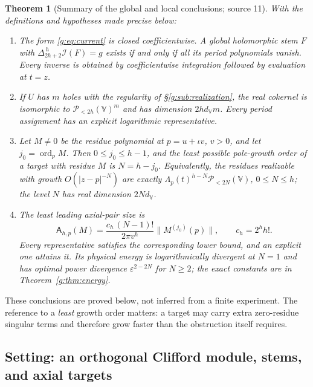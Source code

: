\documentclass[11pt,a4paper]{article}
\numberwithin{equation}{section}
\newtheorem{theorem}{Theorem}[section]
\theoremstyle{definition}
\theoremstyle{remark}
\theoremstyle{plain}
\newcommand{\I}{\mathcal I}
\newcommand{\abs}[1]{\lvert #1\rvert}
\newcommand{\norm}[1]{\lVert #1\rVert}
\newcommand{\lapH}{\Delta_{2h+2}^{\,h}}
\newcommand{\VV}{\mathbb V}                       %
\newcommand{\dV}{d_{\VV}}                         %
\newcommand{\Pol}[1]{\mathscr P_{<#1}(\VV)}       %
\newcommand{\PolH}{\mathscr P_{<2h}(\VV)}
\newcommand{\Rq}{\Lambda}                         %
\DeclareMathOperator{\ord}{ord}
\begin{document}
\begin{theorem}[Summary of the global and local conclusions; source 11]
\label{g:thm:summary}
With the definitions and hypotheses made precise below:
\begin{enumerate}[label=\textup{(\roman*)}]
\item The form \eqref{g:eq:current} is closed coefficientwise. A global
holomorphic stem $F$ with $\lapH\I(F)=g$ exists if and only if all its period
polynomials vanish. Every inverse is obtained by coefficientwise integration
followed by evaluation at $t=z$.
\item If $U$ has $m$ holes with the regularity of \S\ref{g:sub:realization},
the real cokernel is isomorphic to $\PolH^m$ and has dimension $2h\dV m$.
Every period assignment has an explicit logarithmic representative.
\item Let $M\ne0$ be the residue polynomial at $p=u+\iota v$, $v>0$, and let
$j_0=\ord_pM$. Then $0\le j_0\le h-1$, and the least possible pole-growth
order of a target with residue $M$ is $N=h-j_0$. Equivalently, the residues
realizable with growth $O(\abs{z-p}^{-N})$ are exactly
$\Rq_p(t)^{h-N}\Pol{2N}$, $0\le N\le h$; the level $N$ has real dimension
$2N\dV$.
\item The least leading axial-pair size is
\[
 \mathsf A_{h,p}(M)=\frac{c_h\,(N-1)!}{2\pi v^h}\norm{M^{(j_0)}(p)},
 \qquad c_h=2^hh!.
\]
Every representative satisfies the corresponding lower bound, and an explicit
one attains it. Its physical energy is logarithmically divergent at $N=1$ and
has optimal power divergence $\varepsilon^{2-2N}$ for $N\ge2$; the exact
constants are in Theorem~\ref{g:thm:energy}.
\end{enumerate}
\end{theorem}

These conclusions are proved below, not inferred from a finite experiment.
The reference to a \emph{least} growth order matters: a target may carry
extra zero-residue singular terms and therefore grow faster than the
obstruction itself requires.

\subsection{Setting: an orthogonal Clifford module, stems, and axial targets}
\label{g:sub:setting}
\end{document}

